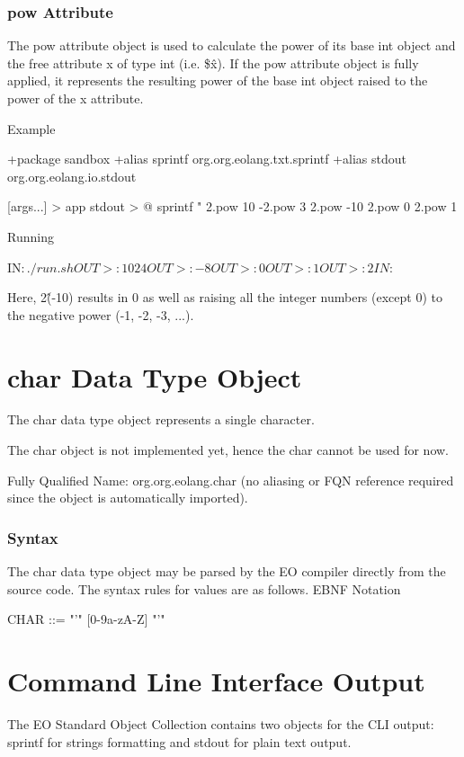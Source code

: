 \documentclass[12pt]{book}
\begin{document}
\subsubsection{pow Attribute}
The pow attribute object is used to calculate the power of its base int object and the free attribute x of type int (i.e. \$\^x).
If the pow attribute object is fully applied, it represents the resulting power of the base int object raised to the power of the x attribute.

Example
\begin{ffcode}
+package sandbox
+alias sprintf org.org.eolang.txt.sprintf
+alias stdout org.org.eolang.io.stdout

[args...] > app
  stdout > @
    sprintf
      "%
      2.pow 10
      -2.pow 3
      2.pow -10
      2.pow 0
      2.pow 1

Running

IN$: ./run.sh
OUT>: 1024
OUT>: -8
OUT>: 0
OUT>: 1
OUT>: 2
IN$: 
\end{ffcode}
Here, 2\^(-10) results in 0 as well as raising all the integer numbers (except 0) to the negative power (-1, -2, -3, ...).

\section{char Data Type Object}
The char data type object represents a single character.

The char object is not implemented yet, hence the char cannot be used for now.

Fully Qualified Name: org.org.eolang.char (no aliasing or FQN reference required since the object is automatically imported).

\subsubsection{Syntax}
The char data type object may be parsed by the EO compiler directly from the source code. The syntax rules for values are as follows.
EBNF Notation

\begin{ffcode}
CHAR     ::= "'" [0-9a-zA-Z] "'"
\end{ffcode}

\section{Command Line Interface Output}
The EO Standard Object Collection contains two objects for the CLI output: sprintf for strings formatting and stdout for plain text output.
\end{document}

